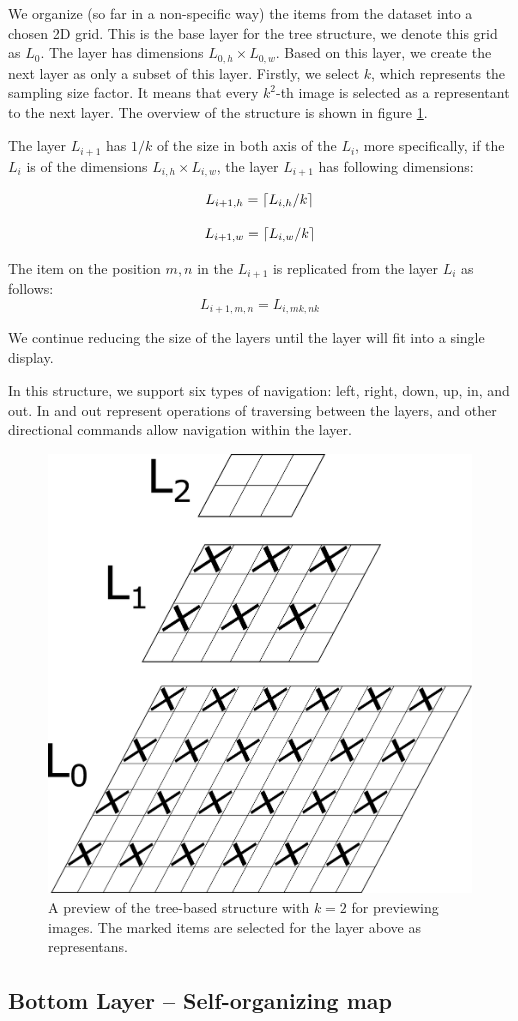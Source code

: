 We organize (so far in a non-specific way) the items from the dataset into a chosen 2D grid. This is the base layer for the tree structure, we denote this grid as $L_0$. The layer has dimensions $L_{0, h}\times L_{0, w}$. Based on this layer, we create the next layer as only a subset of this layer. Firstly, we select $k$, which represents the sampling size factor. It means that every $k^2$-th image is selected as a representant to the next layer. The overview of the structure is shown in figure \ref{fig:tree_structure}. 

The layer $L_{i+1}$ has $1/k$ of the size in both axis of the $L_i$, more specifically, if the $L_i$ is of the dimensions $L_{i,h} \times L_{i,w}$, the layer $L_{i+1}$ has following dimensions:

$$
    L_{i+1, h} = \ceil*{L_{i, h} / k}
$$

$$
    L_{i+1, w} = \ceil*{L_{i, w} / k}
$$


The item on the position $m, n$ in the $L_{i+1}$ is replicated from the layer $L_i$ as follows:
$$
    L_{i+1, m, n} = L_{i, mk, nk} 
$$

We continue reducing the size of the layers until the layer will fit into a single display.

In this structure, we support six types of navigation: left, right, down, up, in, and out. In and out represent operations of traversing between the layers, and other directional commands allow navigation within the layer. 

\begin{figure}
    \centering
    \includegraphics[width=0.3\linewidth]{img/tree-structure.pdf}
    \caption{A preview of the tree-based structure with $k = 2$ for previewing images. The marked items are selected for the layer above as representans.}
    \label{fig:tree_structure}
\end{figure}

\subsection{Bottom Layer -- Self-organizing map}

